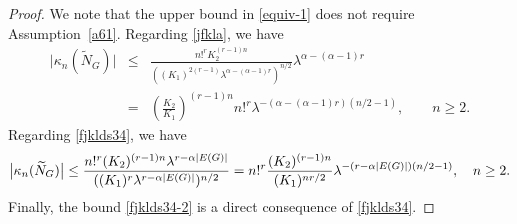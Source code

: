 \documentclass[bj,authoryear,noshowframe]{imsart}
\theoremstyle{plain}
\theoremstyle{remark}
\begin{document}
 \begin{proof}
   We note that the upper bound in \eqref{equiv-1}
   does not require Assumption~\ref{a61}. 
   Regarding \eqref{jfkla}, we have  
 \begin{eqnarray*} 
   \big|\kappa_n(\widetilde{N}_G)\big|
 & \leq &  
   \frac{n!^r %
     K_2^{(r-1)n}}{
    (
     (K_1)^{2(r-1)}
         \lambda^{
 \alpha      -(\alpha - 1)r 
         }
         )^{n/2}}
   \lambda^{
  \alpha          -(\alpha - 1)r 
   }
     \\
     & = & 
  \left(
    \frac{K_2}{K_1}
    \right)^{(r-1)n}
    n!^r
         \lambda^{-(
  \alpha      -(\alpha - 1)r 
        ) ( n/2-1)
    }, \qquad n \geq 2.
 \end{eqnarray*} 
    \noindent
  Regarding \eqref{fjklds34}, we have  
 $$ 
    \big|\kappa_n(\widetilde{N}_G)\big|
  \leq 
    \frac{
   n!^r
   (K_2)^{(r-1)n}
   \lambda^{r-\alpha |E(G)|}
    }{
             (
      (K_1)^r
      \lambda^{r-\alpha |E(G)|}
      )^{n/2}}
 =
    n!^r
    \frac{
      (K_2)^{(r-1)n}}{(K_1)^{nr/2}}
       \lambda^{ - (r-\alpha |E(G)|)(n/2 - 1)}  , 
   \quad n \geq 2. 
 $$ 
  Finally, the bound 
  \eqref{fjklds34-2} is a direct consequence of \eqref{fjklds34}. 
 \end{proof}
 \vspace{-0.1cm}
\end{document}
